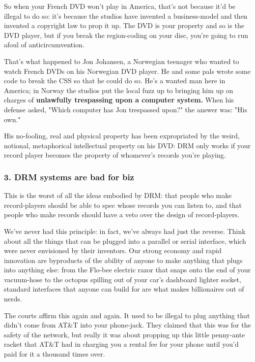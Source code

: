 So when your French DVD won't play in America, that's not because
it'd be illegal to do so: it's because the studios have invented a
business-model and then invented a copyright law to prop it up. The
DVD is your property and so is the DVD player, but if you break the
region-coding on your disc, you're going to run afoul of
anticircumvention.

That's what happened to Jon Johansen, a Norwegian teenager who
wanted to watch French DVDs on his Norwegian DVD player. He and
some pals wrote some code to break the CSS so that he could do so.
He's a wanted man here in America; in Norway the studios put the
local fuzz up to bringing him up on charges of
\textbf{unlawfully trespassing upon a computer system.} When his
defense asked, "Which computer has Jon trespassed upon?" the answer
was: "His own."

His no-fooling, real and physical property has been expropriated by
the weird, notional, metaphorical intellectual property on his DVD:
DRM only works if your record player becomes the property of
whomever's records you're playing.

\subsubsection{3. DRM systems are bad for biz}

This is the worst of all the ideas embodied by DRM: that people who
make record-players should be able to spec whose records you can
listen to, and that people who make records should have a veto over
the design of record-players.

We've never had this principle: in fact, we've always had just the
reverse. Think about all the things that can be plugged into a
parallel or serial interface, which were never envisioned by their
inventors. Our strong economy and rapid innovation are byproducts
of the ability of anyone to make anything that plugs into anything
else: from the Flo-bee electric razor that snaps onto the end of
your vacuum-hose to the octopus spilling out of your car's
dashboard lighter socket, standard interfaces that anyone can build
for are what makes billionaires out of nerds.

The courts affirm this again and again. It used to be illegal to
plug anything that didn't come from AT\&T into your phone-jack.
They claimed that this was for the safety of the network, but
really it was about propping up this little penny-ante racket that
AT\&T had in charging you a rental fee for your phone until you'd
paid for it a thousand times over.

